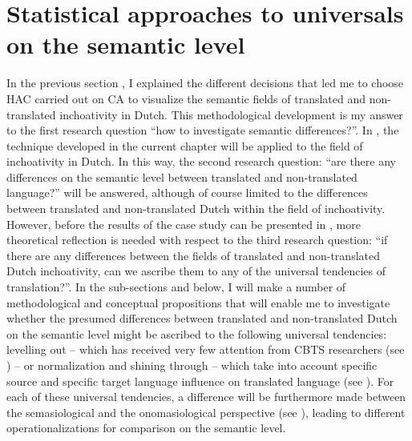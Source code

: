 \section{Statistical approaches to universals on the semantic level}
\label{sec:3.8}
In the previous section , I explained the different decisions that led me to choose HAC carried out on CA to visualize the semantic fields of translated and non-translated inchoativity in Dutch. This methodological development is my answer to the first research question “how to investigate semantic differences?”. In , the technique developed in the current chapter will be applied to the field of inchoativity in Dutch. In this way, the second research question: “are there any differences on the semantic level between translated and non-translated language?” will be answered, although of course limited to the differences between translated and non-translated Dutch within the field of inchoativity. However, before the results of the case study can be presented in , more theoretical reflection is needed with respect to the third research question: “if there are any differences between the fields of translated and non-translated Dutch inchoativity, can we ascribe them to any of the universal tendencies of translation?”. In the sub-sections  and  below, I will make a number of methodological and conceptual propositions that will enable me to investigate whether the presumed differences between translated and non-translated Dutch on the semantic level might be ascribed to the following universal tendencies: levelling out – which has received very few attention from CBTS researchers (see ) – or normalization and shining through – which take into account specific source and specific target language influence on translated language (see ). For each of these universal tendencies, a difference will be furthermore made between the semasiological and the onomasiological perspective (see ), leading to different operationalizations for comparison on the semantic level.

